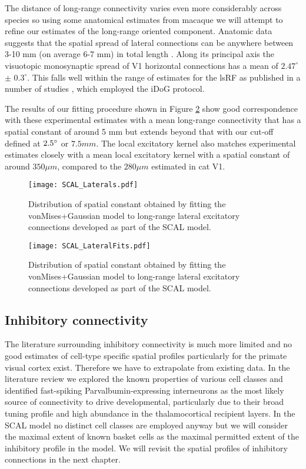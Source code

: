 The distance of long-range connectivity varies even more considerably
across species so using some anatomical estimates from macaque we will
attempt to refine our estimates of the long-range oriented
component. Anatomic data suggests that the spatial spread of lateral
connections can be anywhere between 3-10 mm (on average 6-7 mm) in
total length \cite{Angelucci2002}. Along its principal axis the
visuotopic monosynaptic spread of V1 horizontal connections has a mean
of \(2.47^\circ\) \(\pm\) \(0.3^\circ\). This falls well within the
range of estimates for the lsRF as published in a number of studies
\cite{Sceniak1999, Sceniak2001, Shushruth2009}, which employed the
iDoG protocol.

The results of our fitting procedure shown in Figure \ref{LatDist}
show good correspondence with these experimental estimates with a mean
long-range connectivity that has a spatial constant of around 5 mm but
extends beyond that with our cut-off defined at $2.5\degree$ or $7.5
mm$. The local excitatory kernel also matches experimental estimates
closely with a mean local excitatory kernel with a spatial constant of
around $350 \mu m$, compared to the $280 \mu m$ estimated in cat V1.

\begin{figure}
	\centering
        \texttt{[image: SCAL\_Laterals.pdf]}
	\caption{Distribution of spatial constant obtained by fitting
          the \cite{Buzas2006} vonMises+Gaussian model to long-range
          lateral excitatory connections developed as part of the SCAL
          model.}
	\label{LatFits}
\end{figure}

\begin{figure}
	\centering
        \texttt{[image: SCAL\_LateralFits.pdf]}
	\caption{Distribution of spatial constant obtained by fitting
          the \cite{Buzas2006} vonMises+Gaussian model to long-range
          lateral excitatory connections developed as part of the SCAL
          model.}
	\label{LatDist}
\end{figure}

\subsection{Inhibitory connectivity}

The literature surrounding inhibitory connectivity is much more
limited and no good estimates of cell-type specific spatial profiles
particularly for the primate visual cortex exist. Therefore we have to
extrapolate from existing data. In the literature review we explored
the known properties of various cell classes and identified
fast-spiking Parvalbumin-expressing interneurons as the most likely
source of connectivity to drive developmental, particularly due to
their broad tuning profile and high abundance in the thalamocortical
recipient layers. In the SCAL model no distinct cell classes are
employed anyway but we will consider the maximal extent of known
basket cells as the maximal permitted extent of the inhibitory profile
in the model. We will revisit the spatial profiles of inhibitory
connections in the next chapter.


